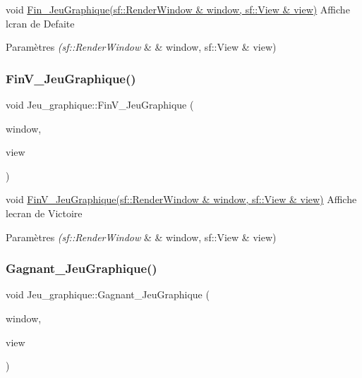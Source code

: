void \hyperlink{classJeu__graphique_a7c0810ad56f4394dc8ddb77779d0b625}{Fin\+\_\+\+Jeu\+Graphique(sf\+::\+Render\+Window \& window, sf\+::\+View \& view)} Affiche l\textquotesingle{}cran de Defaite 


\begin{DoxyParams}{Paramètres}
{\em (sf\+::\+Render\+Window} & \& window, sf\+::\+View \& view) \\
\hline
\end{DoxyParams}
\mbox{\label{classJeu__graphique_a8e27e53ca84c502138ee4603c1a97a2b}} 
\subsubsection{\texorpdfstring{Fin\+V\+\_\+\+Jeu\+Graphique()}{FinV\_JeuGraphique()}}
{\footnotesize\ttfamily void Jeu\+\_\+graphique\+::\+Fin\+V\+\_\+\+Jeu\+Graphique (\begin{DoxyParamCaption}\item[{sf\+::\+Render\+Window \&}]{window,  }\item[{sf\+::\+View \&}]{view }\end{DoxyParamCaption})}



void \hyperlink{classJeu__graphique_a8e27e53ca84c502138ee4603c1a97a2b}{Fin\+V\+\_\+\+Jeu\+Graphique(sf\+::\+Render\+Window \& window, sf\+::\+View \& view)} Affiche l\textquotesingle{}ecran de Victoire 


\begin{DoxyParams}{Paramètres}
{\em (sf\+::\+Render\+Window} & \& window, sf\+::\+View \& view) \\
\hline
\end{DoxyParams}
\mbox{\label{classJeu__graphique_aa26ebcc73b3dbe4c73de32266116e8ff}} 
\subsubsection{\texorpdfstring{Gagnant\+\_\+\+Jeu\+Graphique()}{Gagnant\_JeuGraphique()}}
{\footnotesize\ttfamily void Jeu\+\_\+graphique\+::\+Gagnant\+\_\+\+Jeu\+Graphique (\begin{DoxyParamCaption}\item[{sf\+::\+Render\+Window \&}]{window,  }\item[{sf\+::\+View \&}]{view }\end{DoxyParamCaption})}



